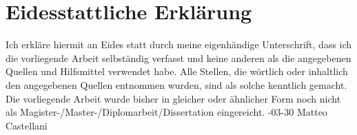 \chapter{Eidesstattliche Erklärung}
\thispagestyle{plain}

Ich erkläre hiermit an Eides statt durch meine eigenhändige Unterschrift, dass ich die vorliegende Arbeit selbständig verfasst und keine anderen als die angegebenen Quellen und Hilfsmittel verwendet habe. Alle Stellen, die wörtlich oder inhaltlich den angegebenen Quellen entnommen wurden, sind als solche kenntlich gemacht.
Die vorliegende Arbeit wurde bisher in gleicher oder ähnlicher Form noch nicht als Magister-/Master-/Diplomarbeit/Dissertation eingereicht.
\newline
{}-03-30
\newline
Matteo Castellani